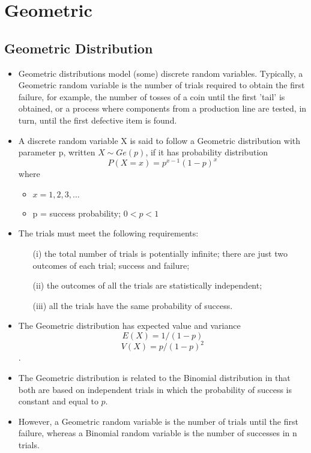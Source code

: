 \documentclass[]{report}
\begin{document}
	


\chapter{Geometric}



\section{Geometric Distribution}
\begin{itemize}
\item Geometric distributions model (some) discrete random variables. Typically, a Geometric random variable is the number of trials required to obtain the first failure, for example, the number of tosses of a coin until the first 'tail' is obtained, or a process where components from a production line are tested, in turn, until the first defective item is found.

\item A discrete random variable X is said to follow a Geometric distribution with parameter p, written $X \sim Ge(p)$, if it has probability distribution
\[P(X=x) = p^{x-1}(1-p)^x\]
where
\begin{itemize}
\item $x = 1, 2, 3, \ldots$
\item p = success probability; $0 < p < 1$
\end{itemize}
\item The trials must meet the following requirements:

\begin{itemize}
\item[(i)] the total number of trials is potentially infinite;
there are just two outcomes of each trial; success and failure;
\item[(ii)] the outcomes of all the trials are statistically independent;
\item[(iii)] all the trials have the same probability of success.
\end{itemize}
\item The Geometric distribution has expected value and variance  \[E(X)= 1/(1-p)\] \[V(X)=p/{(1-p)^2}\].

\item The Geometric distribution is related to the Binomial distribution in that both are based on independent trials in which the probability of success is constant and equal to $p$. 

\item However, a Geometric random variable is the number of trials until the first failure, whereas a Binomial random variable is the number of successes in n trials.
\end{itemize}
\end{document}
